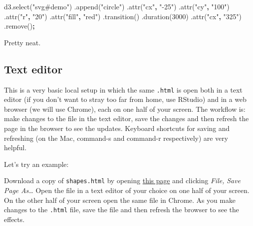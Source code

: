 \documentclass[openany]{book}
\newenvironment{Shaded}{\begin{snugshade}}{\end{snugshade}}
\newcommand{\AttributeTok}[1]{\textcolor[rgb]{0.77,0.63,0.00}{#1}}
\newcommand{\DecValTok}[1]{\textcolor[rgb]{0.00,0.00,0.81}{#1}}
\newcommand{\NormalTok}[1]{#1}
\newcommand{\OperatorTok}[1]{\textcolor[rgb]{0.81,0.36,0.00}{\textbf{#1}}}
\newcommand{\StringTok}[1]{\textcolor[rgb]{0.31,0.60,0.02}{#1}}
\newcommand{\VariableTok}[1]{\textcolor[rgb]{0.00,0.00,0.00}{#1}}
\begin{document}
\begin{Shaded}
\begin{Highlighting}[]
\VariableTok{d3}\NormalTok{.}\AttributeTok{select}\NormalTok{(}\StringTok{"svg#demo"}\NormalTok{)}
\NormalTok{  .}\AttributeTok{append}\NormalTok{(}\StringTok{"circle"}\NormalTok{)}
\NormalTok{    .}\AttributeTok{attr}\NormalTok{(}\StringTok{"cx"}\OperatorTok{,} \StringTok{"-25"}\NormalTok{)              }
\NormalTok{    .}\AttributeTok{attr}\NormalTok{(}\StringTok{"cy"}\OperatorTok{,} \StringTok{"100"}\NormalTok{)}
\NormalTok{    .}\AttributeTok{attr}\NormalTok{(}\StringTok{"r"}\OperatorTok{,} \StringTok{"20"}\NormalTok{)}
\NormalTok{    .}\AttributeTok{attr}\NormalTok{(}\StringTok{"fill"}\OperatorTok{,} \StringTok{"red"}\NormalTok{)}
\NormalTok{  .}\AttributeTok{transition}\NormalTok{()}
\NormalTok{  .}\AttributeTok{duration}\NormalTok{(}\DecValTok{3000}\NormalTok{)}
\NormalTok{    .}\AttributeTok{attr}\NormalTok{(}\StringTok{"cx"}\OperatorTok{,} \StringTok{"325"}\NormalTok{)}
\NormalTok{  .}\AttributeTok{remove}\NormalTok{()}\OperatorTok{;}
\end{Highlighting}
\end{Shaded}

Pretty neat.

\hypertarget{text-editor}{%
\subsection{Text editor}\label{text-editor}}

This is a very basic local setup in which the same \texttt{.html} is open both in a text editor (if you don't want to stray too far from home, use RStudio) and in a web browser (we will use Chrome), each on one half of your screen. The workflow is: make changes to the file in the text editor, save the changes and then refresh the page in the browser to see the updates. Keyboard shortcuts for saving and refreshing (on the Mac, command-s and command-r respectively) are very helpful.

Let's try an example:

Download a copy of \texttt{shapes.html} by opening \href{https://raw.githubusercontent.com/jtr13/d3book/master/code/shapes.html}{this page} and clicking \emph{File, Save Page As\ldots{}} Open the file in a text editor of your choice on one half of your screen. On the other half of your screen open the same file in Chrome. As you make changes to the \texttt{.html} file, save the file and then refresh the browser to see the effects.
\end{document}
